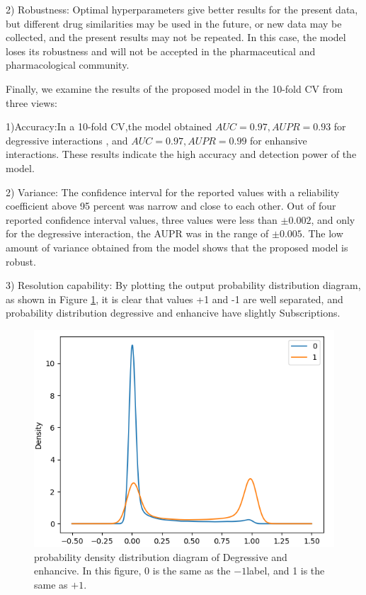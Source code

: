 \documentclass{bmcart}
\begin{document}
2) Robustness: Optimal hyperparameters give better results for the present data, but different drug similarities may be used in the future, or new data may be collected, and the present results may not be repeated. In this case, the model loses its robustness and will not be accepted in the pharmaceutical and pharmacological community.

Finally, we examine the results of the proposed model in the 10-fold CV from three views:

1)Accuracy:In a 10-fold CV,the model obtained $AUC=0.97 , AUPR=0.93$ for degressive interactions , and $AUC=0.97,AUPR=0.99 $ for enhansive interactions. These results indicate the high accuracy and detection power of the model.

2) Variance: The confidence interval for the reported values with a reliability coefficient above 95 percent was narrow and close to each other. Out of four reported confidence interval values, three values were less than $\pm 0.002$, and only for the degressive interaction, the AUPR was in the range of $\pm 0.005$. The low amount of variance obtained from the model shows that the proposed model is robust.

3) Resolution capability: By plotting the output probability distribution diagram, as shown in Figure \ref{DDIProbHist}, it is clear that values +1 and -1 are well separated, and probability distribution degressive and enhancive have slightly Subscriptions.

\begin{figure}[!h]
	\centering
	\includegraphics[scale=0.5]{ModelSelection/densityDegEnh.png}
	\caption{probability density distribution diagram of Degressive and enhancive. In this figure, 0 is the same as the $-1$label, and 1 is the same as $+1$.}
	\label{DDIProbHist}
\end{figure}
\end{document}
